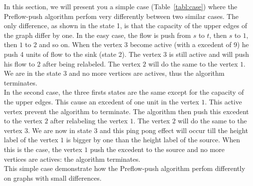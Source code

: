 In this section, we will present you a simple case (Table~\ref{tabl:case}) where the Preflow-push algorithm perfom very differently between two similar cases. The only difference, as shown in the state 1, is that the capacity of the upper edges of the graph differ by one. In the easy case, the flow is push from $s$ to $t$, then $s$ to $1$, then $1$ to $2$ and so on. When the vertex $3$ become active (with a excedent of 9) he push 4 units of flow to the sink (state 2). The vertex $3$ is still active and will push his flow to $2$ after being relabeled. The vertex $2$ will do the same to the vertex $1$. We are in the state 3 and no more vertices are actives, thus the algorithm terminates. \\
In the second case, the three firsts states are the same except for the capacity of the upper edges. This cause an excedent of one unit in the vertex $1$. This active vertex prevent the algorithm to terminate. The algorithm then push this excedent to the vertex $2$ after relabeling the vertex $1$. The vertex $2$ will do the same to the vertex $3$. We are now in state 3 and this ping pong effect will occur till the height label of the vertex $1$ is bigger by one than the height label of the source. When this is the case, the vertex $1$ push the excedent to the source and no more vertices are actives: the algorithm terminates. \\

This simple case demonstrate how the Preflow-push algorithm perfom differently on graphs with small differences.


